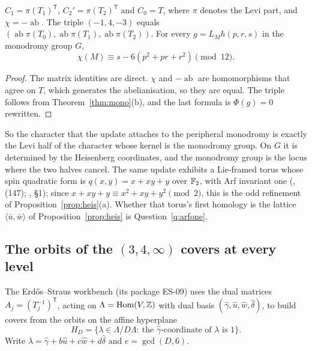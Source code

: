 \begin{theorem}\label{thm:periph}
$C_1=\pi(T_1)^{\mathsf T}$, $C_2'=\pi(T_2)^{\mathsf T}$ and $C_0=T$, where $\pi$ denotes the Levi part, and $\chi=-\operatorname{ab}$. The triple $(-1,4,-3)$ equals $(\operatorname{ab}\pi(T_0),\operatorname{ab}\pi(T_1),\operatorname{ab}\pi(T_2))$. For every $g=L_Mh(p,r,s)$ in the monodromy group $G$,
\[
\chi(M)\equiv s-6(p^2+pr+r^2)\pmod{12}.
\]
\end{theorem}
\begin{proof}
The matrix identities are direct. $\chi$ and $-\operatorname{ab}$ are homomorphisms that agree on $T$, which generates the abelianisation, so they are equal. The triple follows from Theorem~\ref{thm:mono}(b), and the last formula is $\Phi(g)=0$ rewritten.
\end{proof}

So the character that the update attaches to the peripheral monodromy is exactly the Levi half of the character whose kernel is the monodromy group. On $G$ it is determined by the Heisenberg coordinates, and the monodromy group is the locus where the two halves cancel. The same update exhibits a Lie-framed torus whose spin quadratic form is $q(x,y)=x+xy+y$ over $\mathbb{F}_2$, with Arf invariant one (, (147); , §1); since $x+xy+y\equiv x^2+xy+y^2\pmod2$, this is the odd refinement of Proposition~\ref{prop:heis}(a). Whether that torus's first homology is the lattice $\langle\bar u,\bar w\rangle$ of Proposition~\ref{prop:heis} is Question~\ref{q:arfone}.

\subsection{The orbits of the \texorpdfstring{$(3,4,\infty)$}{(3,4,infinity)} covers at every level}

The Erdős--Straus workbench (its package ES-09) uses the dual matrices $A_j=(T_j^{-1})^{\mathsf T}$, acting on $\Lambda=\operatorname{Hom}(V,\mathbb{Z})$ with dual basis $(\hat\gamma,\hat u,\hat w,\hat\delta)$, to build covers from the orbits on the affine hyperplane
\[
H_D=\{\lambda\in\Lambda/D\Lambda:\ \text{the $\hat\gamma$-coordinate of $\lambda$ is }1\}.
\]
Write $\lambda=\hat\gamma+b\hat u+c\hat w+d\hat\delta$ and $e=\gcd(D,6)$.

